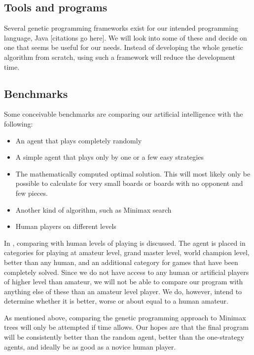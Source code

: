 \documentclass[times, 10pt,twocolumn]{article}
\begin{document}
\subsection{Tools and programs}

Several genetic programming frameworks exist for our intended programming language, Java [citations go here]. We will look into some of these and decide on one that seems be useful for our needs. Instead of developing the whole genetic algorithm from scratch, using such a framework will reduce the development time.

\subsection{Benchmarks}

Some conceivable benchmarks are comparing our artificial intelligence with the following:
\begin{itemize}
	\item{An agent that plays completely randomly}
	\item{A simple agent that plays only by one or a few easy strategies}
	\item{The mathematically computed optimal solution. This will most likely only be possible to calculate for very small boards or boards with no opponent and few pieces.}
	\item{Another kind of algorithm, such as Minimax search}
	\item{Human players on different levels}
\end{itemize}

In \cite{games_solved}, comparing with human levels of playing is discussed.  The agent is placed in categories for playing at amateur level, grand master level, world champion level, better than any human, and an additional category for games that have been completely solved. Since we do not have access to any human or artificial players of higher level than amateur, we will not be able to compare our program with anything else of these than an amateur level player. We do, however, intend to determine whether it is better, worse or about equal to a human amateur.

As mentioned above, comparing the genetic programming approach to Minimax trees will only be attempted if time allows. Our hopes are that the final program will be consistently better than the random agent, better than the one-strategy agents, and ideally be as good as a novice human player.

\end{document}
